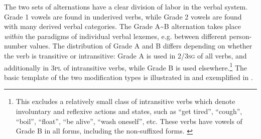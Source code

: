 \documentclass[output=paper,newtxmath,modfonts,nonflat,draftmode]{langsci/langscibook}
\begin{document}
The two sets of alternations have a clear division of labor in the verbal system. Grade 1 vowels are found in underived verbs, while Grade 2 vowels are found with many derived verbal categories. The Grade A{\textasciitilde}B alternation takes place \textit{within} the paradigms of individual verbal lexemes, e.g. between different  person-number values. The distribution of Grade A and B differs depending on whether the verb is transitive or intransitive: Grade A is used in 2/3\textsc{sg} of all verbs, and additionally in 3\textsc{pl} of intransitive verbs, while Grade B is used elsewhere.\footnote{This excludes a relatively small class of intransitive verbs which denote involuntary and reflexive actions and states, such as “get tired”, “cough”, “boil”, “float”, “be alive”, “wash oneself”, etc. These verbs have vowels of Grade B in all forms, including the non-suffixed forms. \label{fn:monich:5} }  The basic template of the two  modification types is illustrated in  and exemplified in . 



\begin{table}[!htb]
\caption{Distribution of Grades A{\textasciitilde}B in inflected verbal forms}
\label{tab:monich:5}
\end{table}
\end{document}

